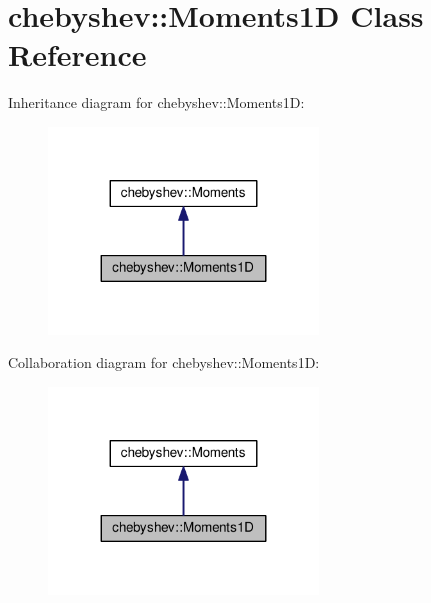 \hypertarget{classchebyshev_1_1_moments1_d}{}\section{chebyshev\+:\+:Moments1D Class Reference}
\label{classchebyshev_1_1_moments1_d}


Inheritance diagram for chebyshev\+:\+:Moments1D\+:\nopagebreak
\begin{figure}[H]
\begin{center}
\leavevmode
\includegraphics[width=203pt]{classchebyshev_1_1_moments1_d__inherit__graph}
\end{center}
\end{figure}


Collaboration diagram for chebyshev\+:\+:Moments1D\+:\nopagebreak
\begin{figure}[H]
\begin{center}
\leavevmode
\includegraphics[width=203pt]{classchebyshev_1_1_moments1_d__coll__graph}
\end{center}
\end{figure}
